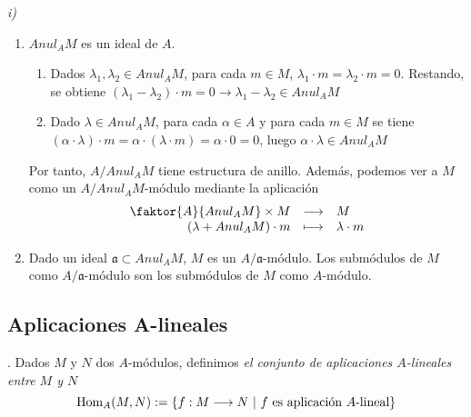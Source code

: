 \documentclass[../main.tex]{subfiles}
\begin{document}
\begin{remark} \textit{i)}

\begin{enumerate}
  \item $Anul_A M$ es un ideal de $A$.
  \begin{enumerate}
    \item Dados $\lambda_1, \lambda_2\in Anul_A M$, para cada $m\in M$, $\lambda_1\cdot m=\lambda_2\cdot m=0$. Restando, se obtiene $(\lambda_1-\lambda_2)\cdot m=0 \rightarrow \lambda_1 -\lambda_2\in Anul_A M$
    \item Dado $\lambda\in Anul_AM$, para cada $\alpha\in A$ y para cada $m\in M$ se tiene $(\alpha\cdot\lambda)\cdot m=\alpha\cdot(\lambda\cdot m) =\alpha\cdot 0=0$, luego $\alpha\cdot\lambda\in Anul_AM$
  \end{enumerate}
  Por tanto, $A/Anul_AM$ tiene estructura de anillo. Además, podemos ver a $M$ como un $A/Anul_AM$-módulo mediante la aplicación
  $$\begin{array}{rcl}
      \faktor{A}{Anul_AM}\times M&\longrightarrow&M\\
      (\lambda + Anul_AM)\cdot m&\longmapsto&\lambda\cdot m
  \end{array}$$
  \item Dado un ideal $\mathfrak{a}\subset Anul_AM$, $M$ es un $A/\mathfrak{a}$-módulo. Los submódulos de $M$ como $A/\mathfrak{a}$-módulo son los submódulos de $M$ como $A$-módulo.
\end{enumerate}
\end{remark}

\subsection{Aplicaciones A-lineales}
\begin{definition}. Dados $M$ y $N$ dos $A$-módulos, definimos \textit{el conjunto de aplicaciones $A$-lineales entre $M$ y $N$}
$$\Hom_A(M,N):=\{f:M\longrightarrow N\ |\ f\text{ es aplicación }A\text{-lineal}\}
$$
\end{definition}
\end{document}
